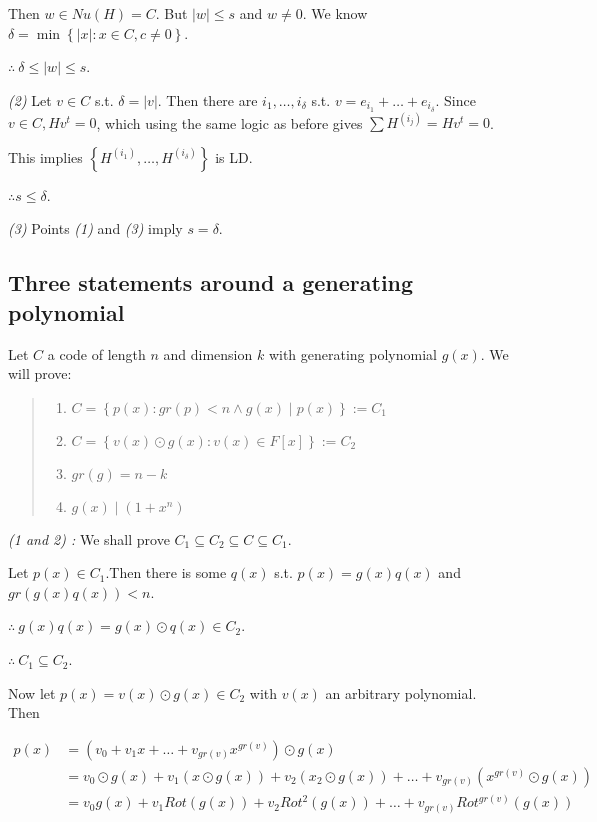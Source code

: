 \documentclass[a4paper]{article}
\begin{document}
Then $w \in Nu(H) = C$. But $|w| \leq s$ and $w \neq 0$. We know $\delta = \min
\left\{ |x| : x \in C, c \neq 0 \right\} $.

$\therefore ~ \delta \leq |w| \leq s$.

\textit{(2)} Let $v \in  C$ s.t. $\delta = |v|$. Then there are 
$i_1, \ldots, i_{\delta}$ s.t. $v = e_{i_1} + \ldots + e_{i_\delta}$.
Since $v \in  C, Hv^t = 0$, which using the same 
logic as before gives $\sum H^{(i_j)} = Hv^t = 0$.

This implies $\left\{ H^{(i_1)}, \ldots, H^{(i_{\delta})} \right\} $ is LD.

$\therefore  s \leq \delta$.

\textit{(3)} Points \textit{(1)} and \textit{(3)} imply $s = \delta$.

\pagebreak 

\subsection{Three statements around a generating polynomial}

Let $C$ a code of length $n$ and dimension $k$ with generating polynomial 
$g(x)$. We will prove: 


\small
\begin{quote}

\begin{enumerate}
    \item $C = \left\{ p(x) : gr(p) < n \land  g(x) \mid p(x) \right\} := C_1$
    \item $C = \left\{ v(x) \odot g(x) : v(x) \in F[x] \right\} := C_2$ 
    \item $gr(g) = n - k$
    \item $g(x) \mid (1 + x^n)$
\end{enumerate}

\end{quote}
\normalsize

\textit{(1 and 2) :} We shall prove $C_1 \subseteq C_2 \subseteq C \subseteq C_1$.

Let $p(x) \in C_1$.Then there is some $q(x)$ s.t. $p(x) = g(x) q(x)$ and 
$gr \left( g(x)q(x) \right) < n $.

$\therefore ~ g(x) q(x) = g(x) \odot q(x) \in C_2$.

$\therefore ~ C_1 \subseteq C_2$.

Now let $p(x) = v(x) \odot g(x) \in C_2$ with $v(x)$ an arbitrary polynomial.
Then

\begin{align*}
    p(x) &= \left( v_0 + v_1x + \ldots + v_{gr(v)} x^{gr(v)} \right)  \odot g(x) \\ 
         &= v_0 \odot g(x) + v_1 \left( x \odot g(x) \right)  + v_2 \left( x_2 \odot g(x) \right)  + \ldots + v_{gr(v)} \left( x^{gr(v)} \odot g(x) \right)  \\ 
         &= v_0 g(x) + v_1 Rot\left( g(x) \right)  + v_2 Rot^2\left( g(x) \right)  + \ldots  +v_{gr(v)} Rot^{gr(v)}\left( g(x) \right)  
\end{align*}
\end{document}
